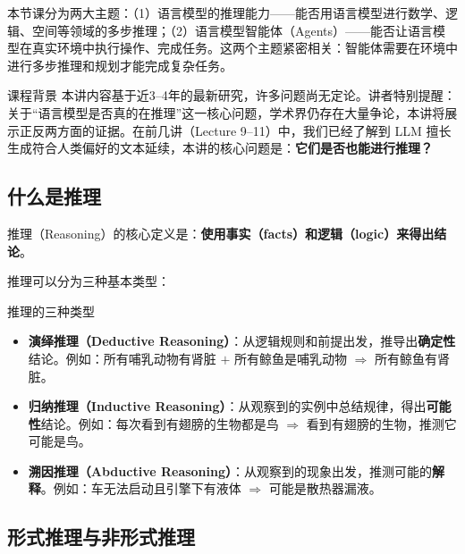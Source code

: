 \documentclass[a4paper]{article}
\begin{document}
本节课分为两大主题：（1）语言模型的推理能力——能否用语言模型进行数学、逻辑、空间等领域的多步推理；（2）语言模型智能体（Agents）——能否让语言模型在真实环境中执行操作、完成任务。这两个主题紧密相关：智能体需要在环境中进行多步推理和规划才能完成复杂任务。





\begin{knowledgebox}{课程背景}
本讲内容基于近3--4年的最新研究，许多问题尚无定论。讲者特别提醒：关于``语言模型是否真的在推理''这一核心问题，学术界仍存在大量争论，本讲将展示正反两方面的证据。在前几讲（Lecture 9--11）中，我们已经了解到 LLM 擅长生成符合人类偏好的文本延续，本讲的核心问题是：\textbf{它们是否也能进行推理？}
\end{knowledgebox}

\subsection{什么是推理}

推理（Reasoning）的核心定义是：\textbf{使用事实（facts）和逻辑（logic）来得出结论}。




推理可以分为三种基本类型：

\begin{importantbox}{推理的三种类型}
\begin{itemize}
    \item \textbf{演绎推理（Deductive Reasoning）}：从逻辑规则和前提出发，推导出\textbf{确定性}结论。例如：所有哺乳动物有肾脏 $+$ 所有鲸鱼是哺乳动物 $\Rightarrow$ 所有鲸鱼有肾脏。
    \item \textbf{归纳推理（Inductive Reasoning）}：从观察到的实例中总结规律，得出\textbf{可能性}结论。例如：每次看到有翅膀的生物都是鸟 $\Rightarrow$ 看到有翅膀的生物，推测它可能是鸟。
    \item \textbf{溯因推理（Abductive Reasoning）}：从观察到的现象出发，推测可能的\textbf{解释}。例如：车无法启动且引擎下有液体 $\Rightarrow$ 可能是散热器漏液。
\end{itemize}
\end{importantbox}

\subsection{形式推理与非形式推理}
\end{document}

